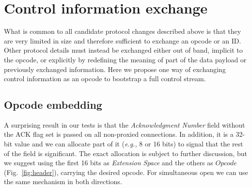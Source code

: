 \documentclass{sig-alternate-10pt}
\providecommand{\eg}{\emph{e.g.,} }
\begin{document}


\section{Control information exchange}
\label{sec:protocol}

What is common to all candidate protocol changes described above is that they are very limited in size and therefore sufficient to exchange an opcode or an ID. Other protocol details must instead be exchanged either out of band, implicit to the opcode, or explicitly by redefining the meaning of part of the data payload or previously exchanged information. Here we propose one way of exchanging control information as an opcode to bootstrap a full control stream.

\subsection{Opcode embedding}

A surprising result in our tests is that the \emph{Acknowledgment Number} field without the ACK flag set is passed on all non-proxied connections. In addition, it is a 32-bit value and we can allocate part of it (\eg 8 or 16 bits) to signal that the rest of the field is significant. The exact allocation is subject to further discussion, but we suggest using the first 16 bits as \emph{Extension Space} and the others as $Opcode$ (Fig.~\ref{fig:header}), carrying the desired opcode. For simultaneous open we can use the same mechanism in both directions.
\end{document}
